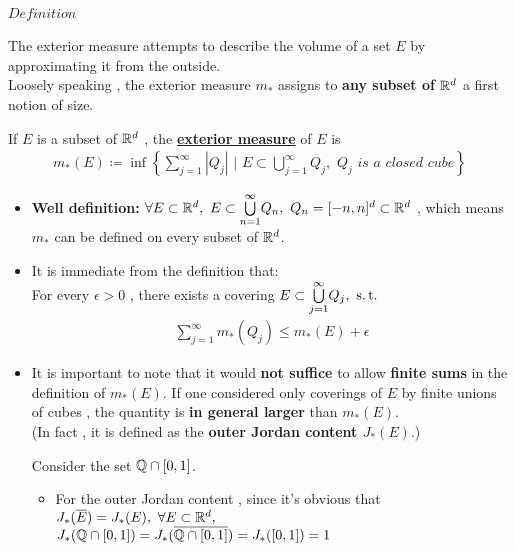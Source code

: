 \paragraph{$Definition$}
	The exterior measure attempts to describe the volume of a set $E$ by approximating it from the outside.\\ Loosely speaking , the exterior measure $m_{*}$ assigns to \textbf{any subset of $\mathbb{R}^d$} a first notion of size.
	\begin{defn}\label{def 1.2.1}
		If $E$ is a subset of $\mathbb{R}^d$ , the \underline{\textbf{exterior measure}} of $E$ is
		\begin{align}
			m_{*}(E) \coloneqq \inf{ \left\{ \sum_{j = 1}^{\infty}{\left| Q_j \right| \,\, \Big| \,\, E \subset \bigcup_{j = 1}^{\infty}{Q_j} , \,\, Q_j \,\, is \,\, a \,\, closed \,\, cube } \right\} }
		\end{align}
	
		\begin{rmk}
			\begin{itemize}
				\item \textbf{Well definition:}  $\forall E \subset \mathbb{R}^d , \,\, E \subset \overset{\infty}{\underset{n = 1}{\bigcup}}{Q_n} , \,\, Q_n = [-n , n]^d \subset \mathbb{R}^d$ , which means $m_{*}$ can be defined on every subset of $\mathbb{R}^d$.
				
				\item It is immediate from the definition that:\\
				For every $\epsilon > 0$ , there exists a covering $E \subset \overset{\infty}{\underset{j = 1}{\bigcup}}{Q_j} , \,\, \operatorname{s.t.}$
				\begin{align}
					\sum_{j = 1}^{\infty}{m_{*}(Q_j)} \leq m_{*}(E) + \epsilon
				\end{align}
				
				\item It is important to note that it would \textbf{not suffice} to allow \textbf{finite sums} in the definition of $m_{*}(E)$. If one considered only coverings of $E$ by finite unions of cubes , the quantity is \textbf{in general larger} than $m_{*}(E)$.\\
				(In fact , it is defined as the \textbf{outer Jordan content $J_{*}(E)$}.)
				\begin{example}\label{ex 1.2.1}
					Consider the set $\mathbb{Q} \cap [0 , 1]$.
					\begin{itemize}
						\item For the outer Jordan content , since it's obvious that $J_{*}(\overline{E}) = J_{*}(E) , \,\, \forall E \subset \mathbb{R}^d , $\\
						$J_{*}(\mathbb{Q} \cap [0 , 1]) = J_{*}(\overline{\mathbb{Q} \cap [0 , 1]}) = J_{*}([0 , 1]) = 1$
						

\end{itemize}
\end{example}
\end{itemize}
\end{rmk}
\end{defn}
